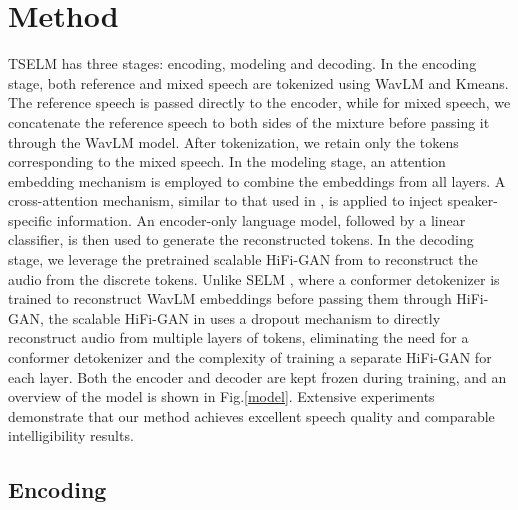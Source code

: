 \documentclass[conference]{IEEEtran}
\begin{document}
\section{Method}
TSELM has three stages: encoding, modeling and decoding. In the encoding stage, both reference and mixed speech are tokenized using WavLM and Kmeans. The reference speech is passed directly to the encoder, while for mixed speech, we concatenate the reference speech to both sides of the mixture before passing it through the WavLM model. After tokenization, we retain only the tokens corresponding to the mixed speech.
In the modeling stage, an attention embedding mechanism is employed to combine the embeddings from all layers. A cross-attention mechanism, similar to that used in \cite{usef_tes}, is applied to inject speaker-specific information. An encoder-only language model, followed by a linear classifier, is then used to generate the reconstructed tokens.
In the decoding stage, we leverage the pretrained scalable HiFi-GAN from \cite{unit_hifi} to reconstruct the audio from the discrete tokens. Unlike SELM \cite{selm}, where a conformer detokenizer is trained to reconstruct WavLM embeddings before passing them through HiFi-GAN, the scalable HiFi-GAN in \cite{unit_hifi} uses a dropout mechanism to directly reconstruct audio from multiple layers of tokens, eliminating the need for a conformer detokenizer and the complexity of training a separate HiFi-GAN for each layer. Both the encoder and decoder are kept frozen during training, and an overview of the model is shown in Fig.\ref{model}.
Extensive experiments demonstrate that our method achieves excellent speech quality and comparable intelligibility results.


\subsection{Encoding}
\end{document}
